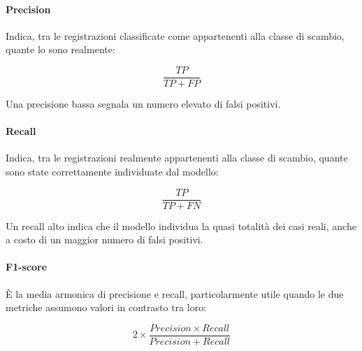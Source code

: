 \paragraph{Precision}
Indica, tra le registrazioni classificate come appartenenti alla classe di scambio, quante lo sono realmente:

\begin{equation}
	\frac{TP}{TP + FP}
\end{equation}

Una precisione bassa segnala un numero elevato di falsi positivi.

\paragraph{Recall}
Indica, tra le registrazioni realmente appartenenti alla classe di scambio, quante sono state correttamente individuate dal modello:

\begin{equation}
	\frac{TP}{TP + FN}
\end{equation}

Un recall alto indica che il modello individua la quasi totalità dei casi reali, anche a costo di un maggior numero di falsi positivi.

\paragraph{F1-score}
È la media armonica di precisione e recall, particolarmente utile quando le due metriche assumono valori in contrasto tra loro:

\begin{equation}
	2 \times \frac{Precision \times Recall}{Precision + Recall}
\end{equation}


